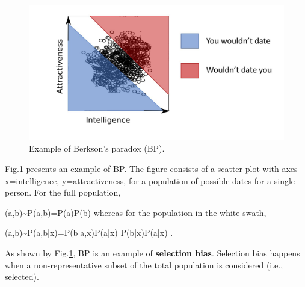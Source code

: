 \begin{figure}[h!]
\centering
\includegraphics[width=5in]
{berkson/berkson.png}
\caption{
Example
of Berkson's paradox (BP).} 
\label{fig-berkson}
\end{figure}


Fig.\ref{fig-berkson}
presents an example
of BP. The
figure consists of
a scatter plot
with axes x=intelligence,
y=attractiveness, 
for a population of 
possible dates for a single person. 
For the full population,

\beq
(a,b)\sim P(a,b)=P(a)P(b)
\eeq
whereas for the population
in the white swath,

\beq
(a,b)\sim P(a,b|x)=P(b|a,x)P(a|x)\neq
P(b|x)P(a|x)
\;.
\eeq

As shown by
Fig.\ref{fig-berkson},
 BP is an example of {\bf selection bias}.
Selection bias happens when
a non-representative
subset of the total population
is considered (i.e., selected).



